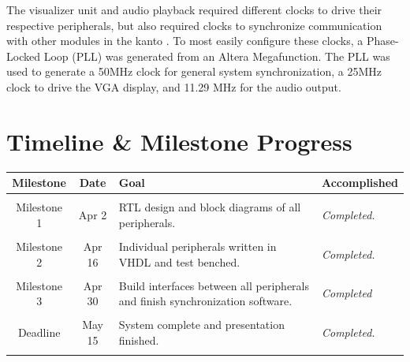 \documentclass{article}
\begin{document}
The visualizer unit and audio playback required different clocks to drive their 
respective peripherals, but also required clocks to synchronize communication 
with other modules in the kanto 
. To most easily configure these clocks, 
a Phase-Locked Loop (PLL) was generated from an Altera Megafunction. The PLL 
was used to generate a 50MHz clock for general system synchronization, a 25MHz 
clock to drive the VGA display, and 11.29 MHz for the audio output. 

\section{Timeline \& Milestone Progress}
\begin{tabular}{cc|p{7cm}p{3cm}}
\textbf{Milestone} & \textbf{Date} & \textbf{Goal} & \textbf{Accomplished}\\ \hline
&&&\\
Milestone 1 & Apr 2 & RTL design and block diagrams of all peripherals.&
	\textit{Completed.}\\
&&&\\
Milestone 2 & Apr 16 & Individual peripherals written in VHDL and test benched.&
	\textit{Completed.}\\
&&&\\
Milestone 3 & Apr 30 & Build interfaces between all peripherals and finish synchronization software. &
	\textit{Completed}\\
&&&\\
Deadline&May 15&System complete and presentation finished.&\textit{Completed.}\\
&&&\\
\end{tabular}
\end{document}
